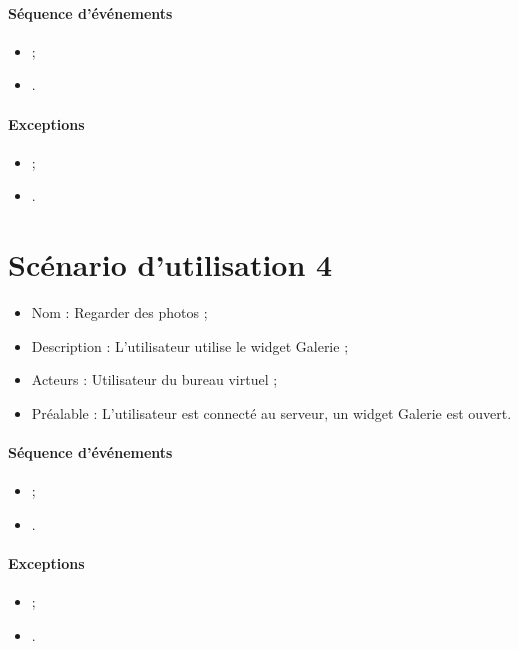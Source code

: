 \paragraph{Séquence d'événements}
\begin{itemize}
	\item ;
	\item .
\end{itemize}

\paragraph{Exceptions}
\begin{itemize}
	\item ;
	\item .
\end{itemize}


\section{Scénario d'utilisation 4}
\begin{itemize}
	\item Nom : Regarder des photos ;
	\item Description : L'utilisateur utilise le widget Galerie ;
	\item Acteurs : Utilisateur du bureau virtuel ;
	\item Préalable : L'utilisateur est connecté au serveur, un widget Galerie est ouvert.
\end{itemize}

\paragraph{Séquence d'événements}
\begin{itemize}
	\item ;
	\item .
\end{itemize}

\paragraph{Exceptions}
\begin{itemize}
	\item ;
	\item .
\end{itemize}



